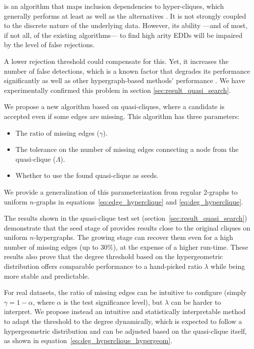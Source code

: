 \Find is an algorithm that maps inclusion dependencies to hyper-cliques,
which generally performs  at least as well as the alternatives \cite{Dursch2019}.
It is not strongly coupled to the discrete nature of the underlying data.
However, its ability ---and of most, if not all, of the existing algorithms--- to find
high arity \glspl{EDD} will be impaired by the level of false rejections.

A lower rejection threshold could compensate for this. Yet, it increases the number
of false detections, which is a known factor that degrades
its performance significantly as well as other hypergraph-based methods' performance  \cite{koeller2006heuristic}.
We have experimentally confirmed this problem in section \ref{sec:result_quasi_search}.

We propose a new algorithm based on quasi-cliques, where a candidate is accepted
even if some edges are missing. This algorithm has three parameters:

\begin{itemize}
    \item The ratio of missing edges ($\gamma$).
    \item The tolerance on the number of missing edges connecting a node from the quasi-clique ($\Lambda$).
    \item Whether to use the found quasi-clique as seeds.
\end{itemize}

We provide a generalization of this parameterization from regular 2-graphs
\cite{brunato2007effectively} to uniform $n$-graphs in equations~\ref{eq:edge_hyperclique}
and \ref{eq:deg_hyperclique}.

The results shown in the quasi-clique test set (section~\ref{sec:result_quasi_search})
demonstrate that the seed stage of \PresQ provides results close to the original
cliques on uniform $n$-hypergraphs. The growing stage
can recover them even for a high number of missing edges (up to $30\%$), at the expense of a higher run-time.
These results also prove that the degree threshold based on the hypergeometric distribution
offers comparable performance to a hand-picked ratio $\lambda$
while being more stable and predictable.

For real datasets, the ratio of missing edges can be intuitive to configure
(simply $\gamma = 1 - \alpha$, where $\alpha$ is the test significance level), 
but $\lambda$ can be harder to interpret. We propose instead an intuitive and statistically
interpretable method to adapt the threshold to the degree dynamically, which is expected
to follow a hypergeometric distribution and can be adjusted based on the quasi-clique
itself, as shown in equation~\ref{eq:deg_hyperclique_hypergeom}.

